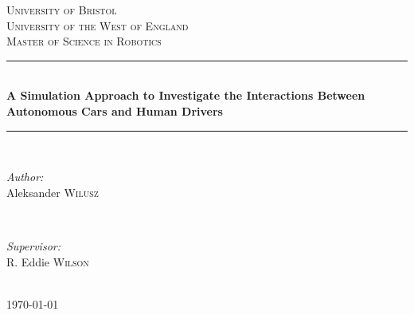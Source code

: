\documentclass[11pt,english,twoside]{article}
\begin{document}

\begin{titlepage}

\newcommand{\HRule}{\rule{\linewidth}{0.5mm}} %

\center %

\textsc{\LARGE University of Bristol}\\[1.0cm] 
\textsc{\LARGE University of the West of England}\\[1.5cm] 
\textsc{\Large Master of Science in Robotics}\\[0.5cm] %


\HRule \\[0.4cm]
{ \huge \bfseries A Simulation Approach to Investigate the Interactions Between Autonomous Cars and Human Drivers}\\[0.4cm] %
\HRule \\[1.5cm]

\begin{minipage}{0.4\textwidth}
\begin{flushleft} \large
\emph{Author:}\\
Aleksander \textsc{Wilusz} %
\end{flushleft}
\end{minipage}
~
\begin{minipage}{0.4\textwidth}
\begin{flushright} \large
\emph{Supervisor:} \\
R. Eddie \textsc{Wilson} %
\end{flushright}
\end{minipage}\\[4cm]


{\large \today}\\[3cm] %


\vfill %

\end{titlepage}
\end{document}
